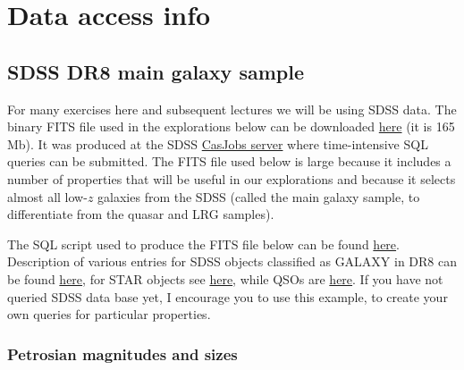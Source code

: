 \chapter{Data access info}

\section{SDSS DR8 main galaxy sample}
 For many exercises here and subsequent lectures we will be using SDSS data. The binary FITS file used in the explorations below can be downloaded \href{http://astro.uchicago.edu/~andrey/classes/a304s15/data/sdss_dr8/SDSSspecgalsDR8.fit}{here} (it is 165 Mb). It was produced at the SDSS \href{http://skyserver.sdss.org/CasJobs/}{CasJobs server} where time-intensive SQL queries can be submitted. The FITS file used below is large because it includes a number of properties that will be useful in our explorations and because it selects almost all low-$z$ galaxies from the SDSS (called the main galaxy sample, to differentiate from the quasar and LRG samples). 

The SQL script used to produce the FITS file below can be found \href{http://astro.uchicago.edu/~andrey/classes/a304s15/data/sdss_dr8/README.txt}{here}. Description of various entries for SDSS objects classified as GALAXY in DR8 can be found \href{http://skyserver.sdss.org/dr8/en/help/browser/browser.asp?n=Galaxy&t=U}{here}, for STAR objects see \href{http://skyserver.sdss.org/dr8/en/help/browser/description.asp?n=Star&t=V}{here}, while QSOs are \href{}{here}. If you have not queried SDSS data base yet, I encourage you to use this example, to create your own queries for particular properties. 

\subsection{Petrosian magnitudes and sizes}
\label{sec:petromagsize}

